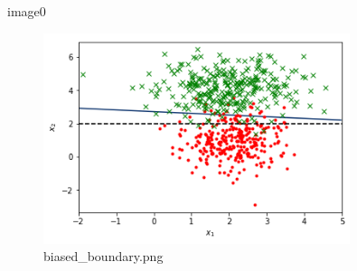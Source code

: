 \documentclass{beamer}%
\begin{document}
%
image0%


\begin{figure}%
\centering%
\includegraphics[width=0.8\textwidth]{biased_boundary.png}%
\caption{biased\_boundary.png}%
\end{figure}

%
\end{document}
